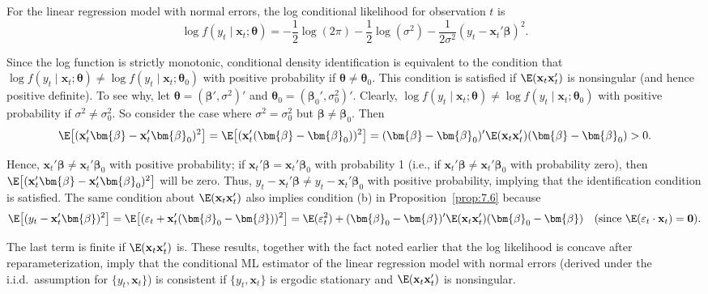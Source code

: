 \begin{example}
\label{ex:7.8}
For the linear regression model with normal errors, the log conditional likelihood for observation $t$ is
\[
\log f(y_t \mid \mathbf{x}_t; \bm{\theta}) = -\frac{1}{2}\log(2\pi) - \frac{1}{2}\log(\sigma^2) - \frac{1}{2\sigma^2}(y_t - \mathbf{x}_t' \bm{\beta})^2.
\]

Since the log function is strictly monotonic, conditional density identification is equivalent to the condition that $\log f(y_t \mid \mathbf{x}_t; \bm{\theta}) \neq \log f(y_t \mid \mathbf{x}_t; \bm{\theta}_0)$ with positive probability if $\bm{\theta} \neq \bm{\theta}_0$. This condition is satisfied if $\E(\mathbf{x}_t \mathbf{x}_t')$ is nonsingular (and hence positive definite). To see why, let $\bm{\theta} = (\bm{\beta}', \sigma^2)'$ and $\bm{\theta}_0 = (\bm{\beta}_0', \sigma_0^2)'$. Clearly, $\log f(y_t \mid \mathbf{x}_t; \bm{\theta}) \neq \log f(y_t \mid \mathbf{x}_t; \bm{\theta}_0)$ with positive probability if $\sigma^2 \neq \sigma_0^2$. So consider the case where $\sigma^2 = \sigma_0^2$ but $\bm{\beta} \neq \bm{\beta}_0$. Then
\[
\E\bigl[(\mathbf{x}_t' \bm{\beta} - \mathbf{x}_t' \bm{\beta}_0)^2\bigr] = \E\bigl[(\mathbf{x}_t' (\bm{\beta} - \bm{\beta}_0))^2\bigr] = (\bm{\beta} - \bm{\beta}_0)' \E(\mathbf{x}_t \mathbf{x}_t') (\bm{\beta} - \bm{\beta}_0) > 0.
\]

Hence, $\mathbf{x}_t' \bm{\beta} \neq \mathbf{x}_t' \bm{\beta}_0$ with positive probability; if $\mathbf{x}_t' \bm{\beta} = \mathbf{x}_t' \bm{\beta}_0$ with probability 1 (i.e., if $\mathbf{x}_t' \bm{\beta} \neq \mathbf{x}_t' \bm{\beta}_0$ with probability zero), then $\E\bigl[(\mathbf{x}_t' \bm{\beta} - \mathbf{x}_t' \bm{\beta}_0)^2\bigr]$ will be zero. Thus, $y_t - \mathbf{x}_t' \bm{\beta} \neq y_t - \mathbf{x}_t' \bm{\beta}_0$ with positive probability, implying that the identification condition is satisfied. The same condition about $\E(\mathbf{x}_t \mathbf{x}_t')$ also implies condition (b) in Proposition~\ref{prop:7.6} because
\[
\E\bigl[(y_t - \mathbf{x}_t' \bm{\beta})^2\bigr] = \E\bigl[(\varepsilon_t + \mathbf{x}_t'(\bm{\beta}_0 - \bm{\beta}))^2\bigr] = \E(\varepsilon_t^2) + (\bm{\beta}_0 - \bm{\beta})' \E(\mathbf{x}_t \mathbf{x}_t')(\bm{\beta}_0 - \bm{\beta}) \quad (\text{since } \E(\varepsilon_t \cdot \mathbf{x}_t) = \mathbf{0}).
\]

The last term is finite if $\E(\mathbf{x}_t \mathbf{x}_t')$ is. These results, together with the fact noted earlier that the log likelihood is concave after reparameterization, imply that the conditional ML estimator of the linear regression model with normal errors (derived under the i.i.d.\ assumption for $\{y_t, \mathbf{x}_t\}$) is consistent if $\{y_t, \mathbf{x}_t\}$ is ergodic stationary and $\E(\mathbf{x}_t \mathbf{x}_t')$ is nonsingular.
\end{example}

